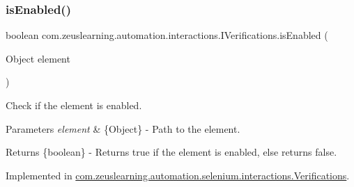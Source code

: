 \hypertarget{interfacecom_1_1zeuslearning_1_1automation_1_1interactions_1_1IVerifications_aa53fca4dbb7f948ef751ac7ebea69f9a}{}\label{interfacecom_1_1zeuslearning_1_1automation_1_1interactions_1_1IVerifications_aa53fca4dbb7f948ef751ac7ebea69f9a} 
\subsubsection{\texorpdfstring{is\+Enabled()}{isEnabled()}}
{\footnotesize\ttfamily boolean com.\+zeuslearning.\+automation.\+interactions.\+I\+Verifications.\+is\+Enabled (\begin{DoxyParamCaption}\item[{Object}]{element }\end{DoxyParamCaption})}

Check if the element is enabled.


\begin{DoxyParams}{Parameters}
{\em element} & \{Object\} -\/ Path to the element. \\
\hline
\end{DoxyParams}
\begin{DoxyReturn}{Returns}
\{boolean\} -\/ Returns {\ttfamily true} if the element is enabled, else returns {\ttfamily false}. 
\end{DoxyReturn}


Implemented in \hyperlink{classcom_1_1zeuslearning_1_1automation_1_1selenium_1_1interactions_1_1Verifications_af83849f7939e2df11760140e6eea3eb0}{com.\+zeuslearning.\+automation.\+selenium.\+interactions.\+Verifications}.

\hypertarget{interfacecom_1_1zeuslearning_1_1automation_1_1interactions_1_1IVerifications_ac9e92358d7f62a1cf1c2760ada26cde9}{}\label{interfacecom_1_1zeuslearning_1_1automation_1_1interactions_1_1IVerifications_ac9e92358d7f62a1cf1c2760ada26cde9} 
